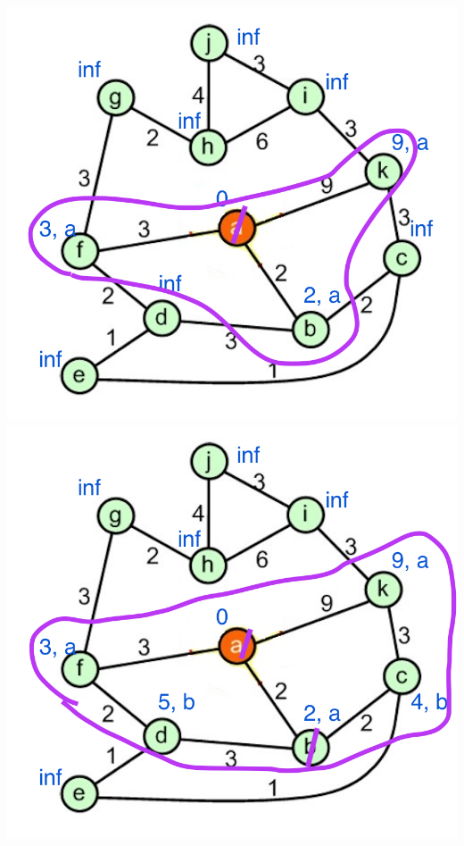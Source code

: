 \documentclass[a4paper]{exam}
\begin{document}
\begin{questions}
\begin{parts}
\begin{solution}
    \includegraphics[scale=0.2]{Q3/images3g/3g3}
    \includegraphics[scale=0.2]{Q3/images3g/3g4}

\end{solution}
\end{parts}
\end{questions}
\end{document}
